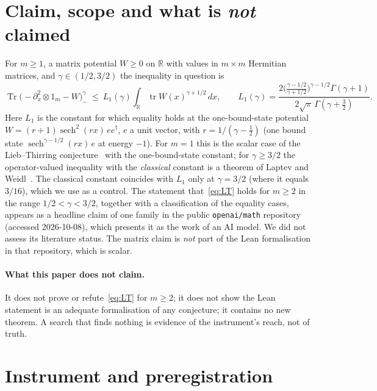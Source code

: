 \documentclass[11pt]{article}
\theoremstyle{remark}
\DeclareMathOperator{\tr}{tr}
\newcommand{\R}{\mathbb{R}}
\newcommand{\Lone}{L_1}
\begin{document}
\section{Claim, scope and what is \emph{not} claimed}
For $m\ge1$, a matrix potential $W\ge0$ on $\R$ with values in $m\times m$ Hermitian matrices, and $\gamma\in(1/2,3/2)$ the inequality in question is
\begin{equation}\label{eq:LT}
 \operatorname{Tr}\bigl(-\partial_x^2\otimes 1_m-W\bigr)_-^{\gamma}\ \le\ \Lone(\gamma)\int_{\R}\tr W(x)^{\gamma+1/2}\,dx,\qquad
 \Lone(\gamma)=\frac{2\bigl(\tfrac{\gamma-1/2}{\gamma+1/2}\bigr)^{\gamma-1/2}\Gamma(\gamma+1)}{2\sqrt\pi\,\Gamma(\gamma+\tfrac32)} .
\end{equation}
Here $\Lone$ is the constant for which equality holds at the one-bound-state potential $W=(r+1)\operatorname{sech}^2(rx)\,ee^{\dagger}$, $e$ a unit vector, with $r=1/(\gamma-\tfrac12)$
(one bound state $\operatorname{sech}^{\gamma-1/2}(rx)\,e$ at energy $-1$). For $m=1$ this is the scalar case of the Lieb--Thirring conjecture~\cite{LT} with the one-bound-state constant; for $\gamma\ge3/2$ the operator-valued inequality with the \emph{classical} constant is
a theorem of Laptev and Weidl~\cite{LW}. The classical constant coincides with $\Lone$ only at $\gamma=3/2$ (where it equals $3/16$), which we use as a control. The statement that~\eqref{eq:LT} holds for $m\ge2$ in the range $1/2<\gamma<3/2$, together with a classification of the equality cases,
appears as a headline claim of one family in the public \texttt{openai/math} repository (accessed 2026-10-08), which presents it as the work of an AI model. We did not assess its literature status.
The matrix claim is \emph{not} part of the Lean formalisation in that repository, which is scalar.

\paragraph{What this paper does not claim.} It does not prove or refute~\eqref{eq:LT} for $m\ge2$; it does not show the Lean statement is an adequate formalisation of any conjecture;
it contains no new theorem. A search that finds nothing is evidence of the instrument's reach, not of truth.

\section{Instrument and preregistration}
\end{document}
